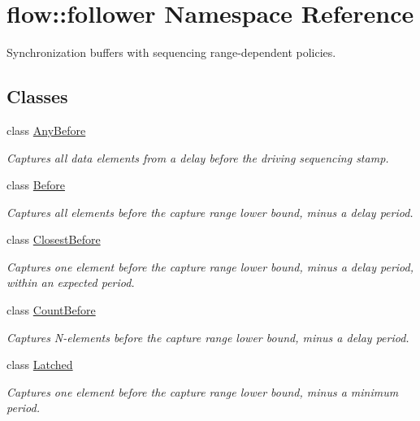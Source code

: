 \hypertarget{namespaceflow_1_1follower}{}\section{flow\+:\+:follower Namespace Reference}
\label{namespaceflow_1_1follower}


Synchronization buffers with sequencing range-\/dependent policies.  


\subsection*{Classes}
\begin{DoxyCompactItemize}
\item 
class \hyperlink{classflow_1_1follower_1_1_any_before}{Any\+Before}
\begin{DoxyCompactList}\small\item\em Captures all data elements from a delay before the driving sequencing stamp. \end{DoxyCompactList}\item 
class \hyperlink{classflow_1_1follower_1_1_before}{Before}
\begin{DoxyCompactList}\small\item\em Captures all elements before the capture range lower bound, minus a delay period. \end{DoxyCompactList}\item 
class \hyperlink{classflow_1_1follower_1_1_closest_before}{Closest\+Before}
\begin{DoxyCompactList}\small\item\em Captures one element before the capture range lower bound, minus a delay period, within an expected period. \end{DoxyCompactList}\item 
class \hyperlink{classflow_1_1follower_1_1_count_before}{Count\+Before}
\begin{DoxyCompactList}\small\item\em Captures N-\/elements before the capture range lower bound, minus a delay period. \end{DoxyCompactList}\item 
class \hyperlink{classflow_1_1follower_1_1_latched}{Latched}
\begin{DoxyCompactList}\small\item\em Captures one element before the capture range lower bound, minus a minimum period. \end{DoxyCompactList}\item 

\end{DoxyCompactItemize}
